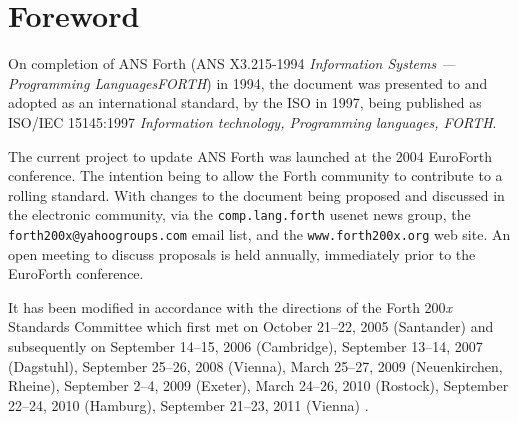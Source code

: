 \chapter*{Foreword}
\label{foreword}

On completion of ANS Forth (ANS X3.215-1994 \emph{Information Systems
--- Programming Languages\linebreak FORTH}) in 1994, the document was presented
to and adopted as an international standard, by the ISO in 1997, being
published as ISO/IEC 15145:1997 \emph{Information technology,
Programming languages, FORTH}.

The current project to update ANS Forth was launched at the 2004
EuroForth conference.  The intention being to allow the Forth community
to contribute to a rolling standard.  With changes to the document
being proposed and discussed in the electronic community, via the
\texttt{comp.lang.forth} usenet news group, the
\texttt{forth200x@yahoogroups.com} email list, and the
\texttt{www.forth200x.org} web site.  An open meeting to discuss
proposals is held annually, immediately prior to the EuroForth
conference.

%
It has been modified in accordance with
the directions of the Forth 200\emph{x} Standards Committee which first
met on October 21--22, 2005 (Santander) and subsequently on
September 14--15, 2006 (Cambridge),
September 13--14, 2007 (Dagstuhl),
September 25--26, 2008 (Vienna),
March 25--27, 2009 (Neuenkirchen, Rheine),
September 2--4, 2009 (Exeter),
March 24--26, 2010 (Rostock),
September 22--24, 2010 (Hamburg),
September 21--23, 2011 (Vienna)%
.
